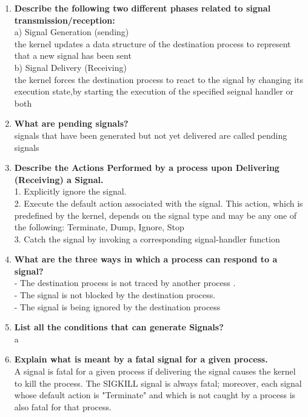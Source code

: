 \documentclass[a4paper,12pt]{article}
\begin{document}
\begin{flushleft}
\begin{enumerate}
\item \textbf{ Describe the following two different phases related to signal transmission/reception:}\\
a) Signal Generation (sending)\\
{\color{red}the kernel updates a data structure of the destination process to represent that a new signal has been sent}\\
 b) Signal Delivery (Receiving)\\
{\color{red}the kernel forces the destination process to react to the signal by changing its execution state,by starting the execution of the specified seignal handler or both}\\
\item \textbf{ What are pending signals?}\\
{\color{red}signals that have been generated but not yet delivered are called pending signals}\\
\item \textbf{ Describe the Actions Performed by a process upon Delivering (Receiving) a Signal.}\\
{\color{red}1. Explicitly ignore the signal.
\\2. Execute the default action associated with the signal. This action, which is predefined by the kernel, depends on the signal type and may be any one of the following: Terminate,  Dump, Ignore, Stop
\\3. Catch the signal by invoking a corresponding signal-handler function
}\\
\item \textbf{ What are the three ways in which a process can respond to a signal?}\\
{\color{red}- The destination process is not traced by another process .\\
- The signal is not blocked by the destination process.
\\- The signal is being ignored by the destination process}\\
\item \textbf{ List all the conditions that can generate Signals?}\\
{\color{red}a}\\
\item \textbf{ Explain what is meant by a fatal signal for a given process.}\\
{\color{red}A signal is fatal for a given process if delivering the signal causes the kernel to kill the process.
The SIGKILL signal is always fatal; moreover, each signal whose default action is "Terminate" and which is not caught by a process is also fatal for that process.
}
\end{enumerate}
\end{flushleft}
\end{document}
